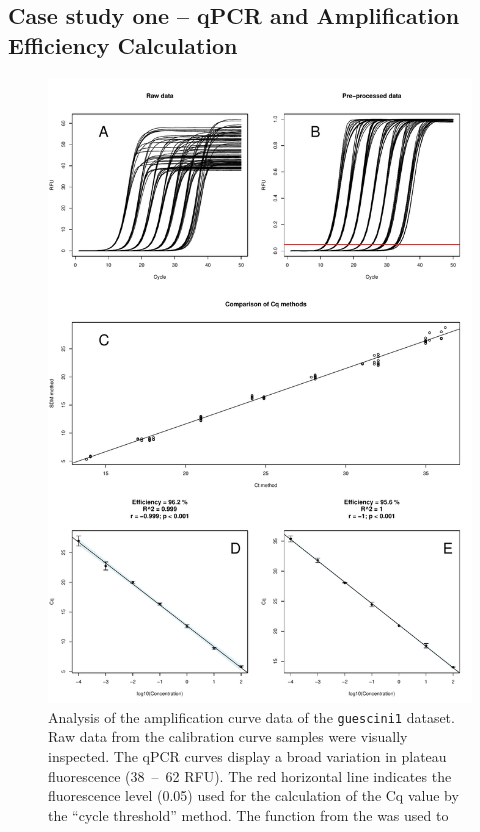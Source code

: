 \subsection{Case study one -- qPCR and Amplification Efficiency Calculation}

\begin{figure}[htbp]
  \centering
  \includegraphics[clip=true, width=14cm]{figures/dilution_Cq.pdf}
  \caption{Analysis of the amplification curve data of the \texttt{guescini1} 
dataset.  Raw data from the calibration curve samples were visually 
inspected. The qPCR curves display a broad variation in plateau fluorescence 
(38~--~62 RFU). The red horizontal line indicates the fluorescence level (0.05) 
used for the calculation of the Cq value by the ``cycle threshold'' method. 
 The  function from the  was used to 
}
\end{figure}
